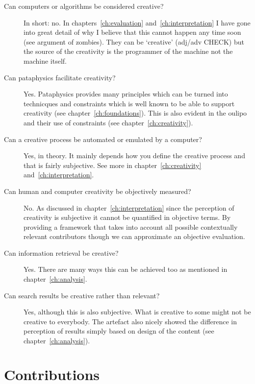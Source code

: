 \begin{description}
  \item[Can computers or algorithms be considered creative?] In short: no. In chapters~\ref{ch:evaluation} and~\ref{ch:interpretation} I have gone into great detail of why I believe that this cannot happen any time soon (see argument of zombies). They can be `creative' (adj/adv CHECK) but the source of the creativity is the programmer of the machine not the machine itself.
  \item[Can pataphysics facilitate creativity?] Yes. Pataphysics provides many principles which can be turned into technicques and constraints which is well known to be able to support creativity (see chapter~\ref{ch:foundations}). This is also evident in the \gls{oulipo} and their use of constraints (see chapter~\ref{ch:creativity}).
  \item[Can a creative process be automated or emulated by a computer?] Yes, in theory. It mainly depends how you define the creative process and that is fairly subjective. See more in chapter~\ref{ch:creativity} and~\ref{ch:interpretation}.
  \item[Can human and computer creativity be objectively measured?] No. As discussed in chapter~\ref{ch:interpretation} since the perception of creativity is subjective it cannot be quantified in objective terms. By providing a framework that takes into account all possible contextually relevant contributors though we can approximate an objective evaluation.
  \item[Can information retrieval be creative?] Yes. There are many ways this can be achieved too as mentioned in chapter~\ref{ch:analysis}.
  \item[Can search results be creative rather than relevant?] Yes, although this is also subjective. What is creative to some might not be creative to everybody. The artefact also nicely showed the difference in perception of results simply based on design of the content (see chapter~\ref{ch:analysis}).
\end{description}



\section{Contributions}

